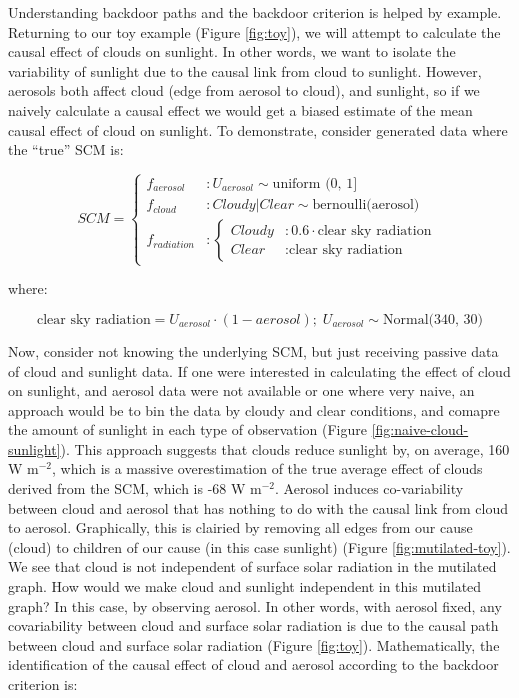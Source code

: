 \documentclass[12pt]{article}
\begin{document}
Understanding backdoor paths and the backdoor criterion is helped by
example. Returning to our toy example (Figure \ref{fig:toy}), we will
attempt to calculate the causal effect of clouds on sunlight. In other
words, we want to isolate the variability of sunlight due to the
causal link from cloud to sunlight. However, aerosols both affect
cloud (edge from aerosol to cloud), and sunlight, so if we naively
calculate a causal effect we would get a biased estimate of the mean
causal effect of cloud on sunlight. To demonstrate, consider generated
data where the ``true'' SCM is:

\begin{equation}
  SCM =
  \begin{cases}
    f_{aerosol} &: U_{aerosol} \sim \text{uniform (0, 1]}\\
    f_{cloud} &: Cloudy | Clear \sim \text{bernoulli(aerosol)}     \\
    f_{radiation} &: \begin{cases}
      Cloudy &: 0.6 \cdot \text{clear sky radiation}  \\
      Clear &: \text{clear sky radiation}
    \end{cases}
  \end{cases}
\end{equation}

where:

\begin{equation*}
  \text{clear sky radiation} = U_{aerosol} \cdot (1 - aerosol); \;
  U_{aerosol} \sim \text{Normal(340, 30)}
\end{equation*}

Now, consider not knowing the underlying SCM, but just receiving
passive data of cloud and sunlight data. If one were interested in
calculating the effect of cloud on sunlight, and aerosol data were not
available or one where very naive, an approach would be to bin the
data by cloudy and clear conditions, and comapre the amount of
sunlight in each type of observation (Figure
\ref{fig:naive-cloud-sunlight}). This approach suggests that clouds
reduce sunlight by, on average, 160 W m$^{-2}$, which is a massive
overestimation of the true average effect of clouds derived from the
SCM, which is -68 W m$^{-2}$. Aerosol induces co-variability between
cloud and aerosol that has nothing to do with the causal link from
cloud to aerosol. Graphically, this is clairied by removing all edges
from our cause (cloud) to children of our cause (in this case
sunlight) (Figure \ref{fig:mutilated-toy}). We see that cloud is not
independent of surface solar radiation in the mutilated graph.  How
would we make cloud and sunlight independent in this mutilated graph?
In this case, by observing aerosol. In other words, with aerosol
fixed, any covariability between cloud and surface solar radiation is
due to the causal path between cloud and surface solar radiation
(Figure \ref{fig:toy}).  Mathematically, the identification of the
causal effect of cloud and aerosol according to the backdoor criterion
is:
\end{document}
